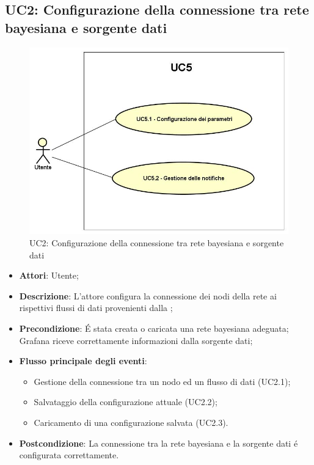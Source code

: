 \subsection{UC2: Configurazione della connessione tra rete bayesiana e sorgente dati}
\begin{figure} [H]
	\centering
	\includegraphics[scale=0.45]{Img/UC5}
	\caption{UC2: Configurazione della connessione tra rete bayesiana e sorgente dati}\label{}
\end{figure}
\begin{itemize}
	\item \textbf{Attori}: Utente;
	\item \textbf{Descrizione}: L'attore configura la connessione dei nodi della rete ai rispettivi flussi di dati provenienti dalla ;
	\item \textbf{Precondizione}: É stata creata o caricata una rete bayesiana adeguata; Grafana riceve correttamente informazioni dalla sorgente dati;
	\item \textbf{Flusso principale degli eventi}:
	\begin{itemize}
		\item Gestione della connessione tra un nodo ed un flusso di dati (UC2.1);
		\item Salvataggio della configurazione attuale (UC2.2);
		\item Caricamento di una configurazione salvata (UC2.3).
	\end{itemize}
	\item \textbf{Postcondizione}: La connessione tra la rete bayesiana e la sorgente dati é configurata correttamente.
\end{itemize}

